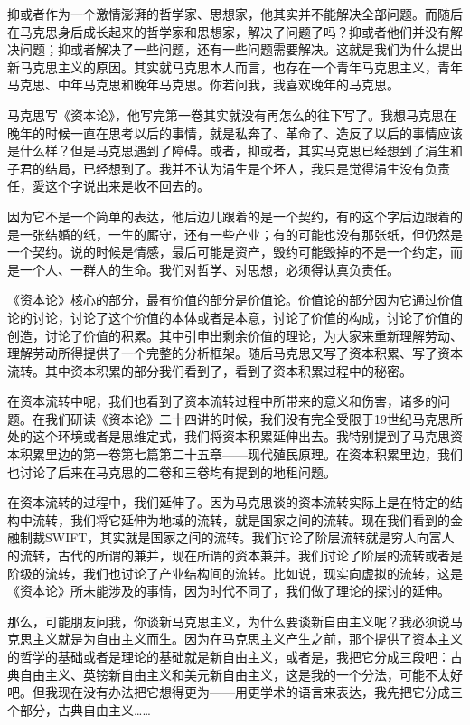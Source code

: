 \documentclass[UTF8, 12pt, a4paper]{ctexrep}
\begin{document}
抑或者作为一个激情澎湃的哲学家、思想家，他其实并不能解决全部问题。而随后在马克思身后成长起来的哲学家和思想家，解决了问题了吗？抑或者他们并没有解决问题；抑或者解决了一些问题，还有一些问题需要解决。这就是我们为什么提出新马克思主义的原因。其实就马克思本人而言，也存在一个青年马克思主义，青年马克思、中年马克思和晚年马克思。你若问我，我喜欢晚年的马克思。

马克思写《资本论》，他写完第一卷其实就没有再怎么的往下写了。我想马克思在晚年的时候一直在思考以后的事情，就是私奔了、革命了、造反了以后的事情应该是什么样？但是马克思遇到了障碍。或者，抑或者，其实马克思已经想到了涓生和子君的结局，已经想到了。我并不认为涓生是个坏人，我只是觉得涓生没有负责任，愛这个字说出来是收不回去的。

因为它不是一个简单的表达，他后边儿跟着的是一个契约，有的这个字后边跟着的是一张结婚的纸，一生的厮守，还有一些产业；有的可能也没有那张纸，但仍然是一个契约。说的时候是情感，最后可能是资产，毁约可能毁掉的不是一个约定，而是一个人、一群人的生命。我们对哲学、对思想，必须得认真负责任。

《资本论》核心的部分，最有价值的部分是价值论。价值论的部分因为它通过价值论的讨论，讨论了这个价值的本体或者是本意，讨论了价值的构成，讨论了价值的创造，讨论了价值的积累。其中引申出剩余价值的理论，为大家来重新理解劳动、理解劳动所得提供了一个完整的分析框架。随后马克思又写了资本积累、写了资本流转。其中资本积累的部分我们看到了，看到了资本积累过程中的秘密。

在资本流转中呢，我们也看到了资本流转过程中所带来的意义和伤害，诸多的问题。在我们研读《资本论》二十四讲的时候，我们没有完全受限于19世纪马克思所处的这个环境或者是思维定式，我们将资本积累延伸出去。我特别提到了马克思资本积累里边的第一卷第七篇第二十五章——现代殖民原理。在资本积累里边，我们也讨论了后来在马克思的二卷和三卷均有提到的地租问题。

在资本流转的过程中，我们延伸了。因为马克思谈的资本流转实际上是在特定的结构中流转，我们将它延伸为地域的流转，就是国家之间的流转。现在我们看到的金融制裁SWIFT，其实就是国家之间的流转。我们讨论了阶层流转就是穷人向富人的流转，古代的所谓的兼并，现在所谓的资本兼并。我们讨论了阶层的流转或者是阶级的流转，我们也讨论了产业结构间的流转。比如说，现实向虚拟的流转，这是《资本论》所未能涉及的事情，因为时代不同了，我们做了理论的探讨的延伸。

那么，可能朋友问我，你谈新马克思主义，为什么要谈新自由主义呢？我必须说马克思主义就是为自由主义而生。因为在马克思主义产生之前，那个提供了资本主义的哲学的基础或者是理论的基础就是新自由主义，或者是，我把它分成三段吧：古典自由主义、英镑新自由主义和美元新自由主义，这是我的一个分法，可能不太好吧。但我现在没有办法把它想得更为——用更学术的语言来表达，我先把它分成三个部分，古典自由主义……
\end{document}
